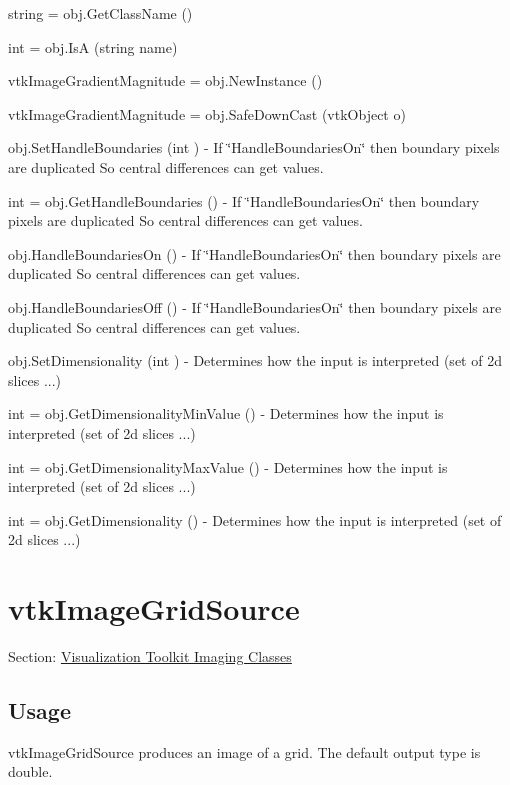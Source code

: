 \begin{DoxyItemize}
\item {\ttfamily string = obj.\-Get\-Class\-Name ()}  
\item {\ttfamily int = obj.\-Is\-A (string name)}  
\item {\ttfamily vtk\-Image\-Gradient\-Magnitude = obj.\-New\-Instance ()}  
\item {\ttfamily vtk\-Image\-Gradient\-Magnitude = obj.\-Safe\-Down\-Cast (vtk\-Object o)}  
\item {\ttfamily obj.\-Set\-Handle\-Boundaries (int )} -\/ If \char`\"{}\-Handle\-Boundaries\-On\char`\"{} then boundary pixels are duplicated So central differences can get values.  
\item {\ttfamily int = obj.\-Get\-Handle\-Boundaries ()} -\/ If \char`\"{}\-Handle\-Boundaries\-On\char`\"{} then boundary pixels are duplicated So central differences can get values.  
\item {\ttfamily obj.\-Handle\-Boundaries\-On ()} -\/ If \char`\"{}\-Handle\-Boundaries\-On\char`\"{} then boundary pixels are duplicated So central differences can get values.  
\item {\ttfamily obj.\-Handle\-Boundaries\-Off ()} -\/ If \char`\"{}\-Handle\-Boundaries\-On\char`\"{} then boundary pixels are duplicated So central differences can get values.  
\item {\ttfamily obj.\-Set\-Dimensionality (int )} -\/ Determines how the input is interpreted (set of 2d slices ...)  
\item {\ttfamily int = obj.\-Get\-Dimensionality\-Min\-Value ()} -\/ Determines how the input is interpreted (set of 2d slices ...)  
\item {\ttfamily int = obj.\-Get\-Dimensionality\-Max\-Value ()} -\/ Determines how the input is interpreted (set of 2d slices ...)  
\item {\ttfamily int = obj.\-Get\-Dimensionality ()} -\/ Determines how the input is interpreted (set of 2d slices ...)  
\end{DoxyItemize}\hypertarget{vtkimaging_vtkimagegridsource}{}\section{vtk\-Image\-Grid\-Source}\label{vtkimaging_vtkimagegridsource}
Section\-: \hyperlink{sec_vtkimaging}{Visualization Toolkit Imaging Classes} \hypertarget{vtkwidgets_vtkxyplotwidget_Usage}{}\subsection{Usage}\label{vtkwidgets_vtkxyplotwidget_Usage}
vtk\-Image\-Grid\-Source produces an image of a grid. The default output type is double.

